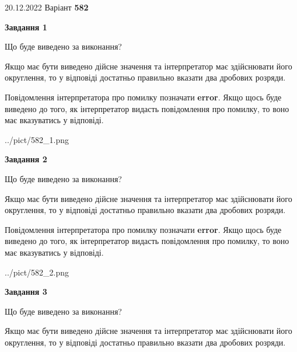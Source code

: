 \documentclass[12pt, ukrainian]{article}
\begin{document}
{20.12.2022 Варіант \No \textbf { 582 }\par}
{
\begin {Large}

{\begin {center}\textbf{Завдання 1}\end {center}}\par
Що буде виведено за виконання? \par

Якщо має бути виведено дійсне значення та інтерпретатор має здійснювати його округлення, 
то у відповіді достатньо правильно вказати два дробових розряди.

Повідомлення інтерпретатора про помилку позначати \textbf{error}.
Якщо щось буде виведено до того, як інтерпретатор видасть повідомлення про помилку, 
то воно має вказуватись у відповіді. \par

\begin{center}
	{../pict/582_1.png}
\end{center}
\newpage

{\begin {center}\textbf{Завдання 2}\end {center}}\par
Що буде виведено за виконання? \par

Якщо має бути виведено дійсне значення та інтерпретатор має здійснювати його округлення, 
то у відповіді достатньо правильно вказати два дробових розряди.

Повідомлення інтерпретатора про помилку позначати \textbf{error}.
Якщо щось буде виведено до того, як інтерпретатор видасть повідомлення про помилку, 
то воно має вказуватись у відповіді. \par

\begin{center}
	{../pict/582_2.png}
\end{center}
\newpage

{\begin {center}\textbf{Завдання 3}\end {center}}\par
Що буде виведено за виконання? \par

Якщо має бути виведено дійсне значення та інтерпретатор має здійснювати його округлення, 
то у відповіді достатньо правильно вказати два дробових розряди.


\end{Large}}
\end{document}
